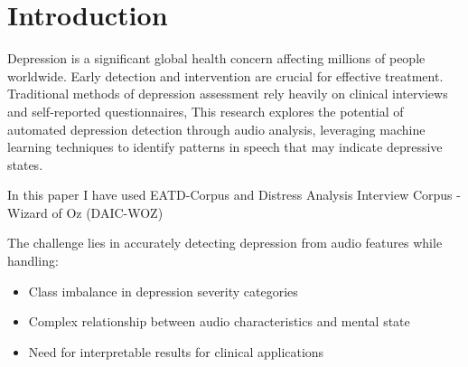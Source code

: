 \section{Introduction}
Depression is a significant global health concern affecting millions of people worldwide.\cite{WHO_Mental_Disorders_2019} Early detection and intervention are crucial for effective treatment. Traditional methods of depression assessment rely heavily on clinical interviews and self-reported questionnaires, This research explores the potential of automated depression detection through audio analysis, leveraging machine learning techniques to identify patterns in speech that may indicate depressive states.

In this paper I have used EATD-Corpus\cite{shen2022automaticdepressiondetectionemotional} and Distress Analysis Interview Corpus - Wizard of Oz
(DAIC-WOZ)\cite{Gratch2014}\cite{DAICWOZ}

The challenge lies in accurately detecting depression from audio features while handling:
\begin{itemize}
    \item Class imbalance in depression severity categories
    \item Complex relationship between audio characteristics and mental state
    \item Need for interpretable results for clinical applications
\end{itemize}